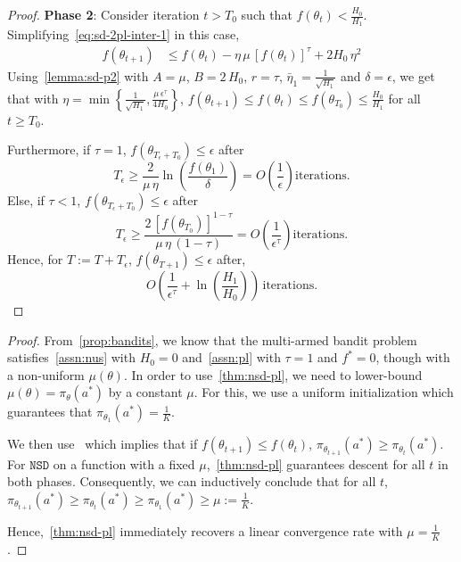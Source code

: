 \documentclass{article}
\newcommand{\tht}{\theta_t}
\newcommand{\thtt}{\theta_{t+1}}
\newcommand{\NSD}{\texttt{NSD}}
\begin{document}
\begin{proof}
\textbf{Phase 2}: Consider iteration $t > T_0$ such that $f(\tht) < \frac{H_0}{H_1}$. Simplifying~\cref{eq:sd-2pl-inter-1} in this case, 
\begin{align*}
f(\thtt) & \leq f(\tht) - \eta \,  \mu \, [f(\tht)]^{\tau} + 2 H_0 \, \eta^2 
\end{align*}
Using~\cref{lemma:sd-p2} with $A = \mu$, $B = 2 \, H_0$, $r = \tau$, $\bar{\eta}_1 = \frac{1}{\sqrt{H_1}}$ and $\delta = \epsilon$, we get that with $\eta = \min\left\{\frac{1}{\sqrt{H_1}}, \frac{\mu \, \epsilon^{\tau}}{4 H_0}\right\}$, $f(\thtt) \leq f(\tht) \leq f(\theta_{T_0}) \leq \frac{H_0}{H_1}$ for all $t \geq T_0$. 

Furthermore, if $\tau = 1$, $f(\theta_{T_\epsilon + T_0}) \leq \epsilon$ after 
\[
T_\epsilon \geq \frac{2}{\mu \, \eta} \ln\left(\frac{f(\theta_1)}{\delta}\right)= O \left( \frac{1}{\epsilon} \right) \text{iterations}. 
\] 
Else, if $\tau < 1$, $f(\theta_{T_\epsilon + T_0}) \leq \epsilon$ after 
\[
T_\epsilon \geq \frac{2 \, [f(\theta_{T_0})]^{1 - \tau}}{\mu \, \eta \, (1 - \tau)} = O \left( \frac{1}{\epsilon^{\tau}} \right) \text{iterations}. 
\]
Hence, for $T := T + T_\epsilon$, $f(\theta_{T+1}) \leq \epsilon$ after, 
\[
O \left( \frac{1}{\epsilon^{\tau}} + \ln \left( \frac{H_1}{H_0} \right) \right) \, \text{iterations.}
\]
\end{proof}

\bandits*
\begin{proof}
From~\cref{prop:bandits}, we know that the multi-armed bandit problem  satisfies~\cref{assn:nus} with $H_0 = 0$ and~\cref{assn:pl} with $\tau = 1$ and $f^* = 0$, though with a non-uniform $\mu(\theta)$. In order to use~\cref{thm:nsd-pl}, we need to lower-bound $\mu(\theta) = \pi_\theta(a^*)$ by a constant $\mu$. For this, we use a uniform initialization which guarantees that $\pi_{\theta_1}(a^*) = \frac{1}{K}$. 

We then use~\citet[Proposition 2]{mei2020global} which implies that if $f(\thtt) \leq f(\tht)$, $\pi_{\thtt}(a^*) \geq \pi_{\tht}(a^*)$. For $\NSD$ on a function with a fixed $\mu$,~\cref{thm:nsd-pl} guarantees descent for all $t$ in both phases. Consequently, we can inductively conclude that for all $t$, $\pi_{\thtt}(a^*) \geq \pi_{\tht}(a^*) \geq \pi_{\theta_1}(a^*) \geq \mu := \frac{1}{K}$. 

Hence,~\cref{thm:nsd-pl} immediately recovers a linear convergence rate with $\mu = \frac{1}{K}$. 
\end{proof}
\end{document}
